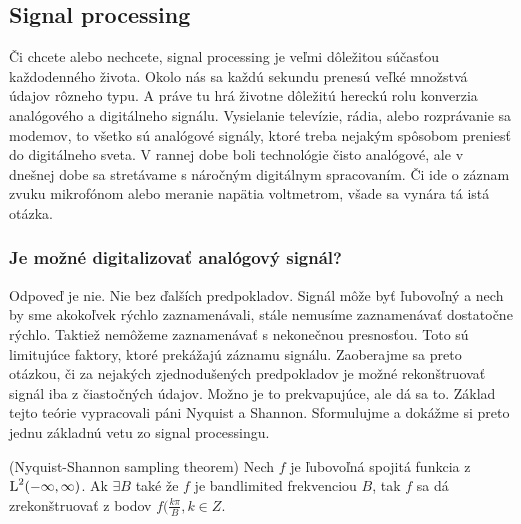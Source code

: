 \subsection{Signal processing}
Či chcete alebo nechcete, signal processing je veľmi dôležitou
súčasťou každodenného života. Okolo nás sa každú sekundu prenesú veľké
množstvá údajov rôzneho typu. A práve tu hrá životne dôležitú hereckú
rolu konverzia analógového a digitálneho signálu. Vysielanie
televízie, rádia, alebo rozprávanie sa modemov, to všetko sú analógové
signály, ktoré treba nejakým spôsobom preniesť do digitálneho sveta. V
rannej dobe boli technológie čisto analógové, ale v dnešnej dobe sa
stretávame s náročným digitálnym spracovaním. Či ide o záznam zvuku
mikrofónom alebo meranie napätia voltmetrom, všade sa vynára tá istá
otázka.

\subsubsection{Je možné digitalizovať analógový signál?}
Odpoveď je nie. Nie bez ďalších predpokladov. Signál môže byť
ľubovoľný a nech by sme akokoľvek rýchlo zaznamenávali, stále nemusíme
zaznamenávať dostatočne rýchlo. Taktiež nemôžeme zaznamenávať s
nekonečnou presnosťou. Toto sú limitujúce faktory, ktoré prekážajú
záznamu signálu. Zaoberajme sa preto otázkou, či za nejakých
zjednodušených predpokladov je možné rekonštruovať signál iba z
čiastočných údajov. Možno je to prekvapujúce, ale dá sa to. Základ
tejto teórie vypracovali páni Nyquist a Shannon. Sformulujme a dokážme
si preto jednu základnú vetu zo signal processingu.

\begin{veta}
    (Nyquist-Shannon sampling theorem) Nech $f$ je ľubovoľná spojitá
    funkcia z $\mbox{L}^2(-\infty,\infty)$. Ak $\exists B$ také že $f$ je bandlimited
    frekvenciou $B$, tak $f$ sa dá zrekonštruovať z bodov $f(\frac{k
    \pi}{B}, k\in Z$. 
\end{veta}

